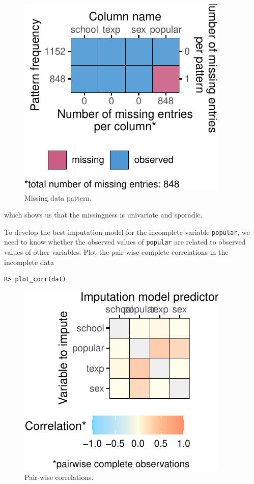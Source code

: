 \documentclass[
  article]{jss}
\begin{document}
\begin{figure}[h]

{\centering \includegraphics{manuscript_files/figure-pdf/fig-pattern-1.pdf}

}

\caption{\label{fig-pattern}Missing data pattern.}

\end{figure}

which shows us that the missingness is univariate and sporadic.

To develop the best imputation model for the incomplete variable
\texttt{popular}, we need to know whether the observed values of
\texttt{popular} are related to observed values of other variables. Plot
the pair-wise complete correlations in the incomplete data

\begin{verbatim}
R> plot_corr(dat)
\end{verbatim}

\begin{figure}[h]

{\centering \includegraphics{manuscript_files/figure-pdf/unnamed-chunk-9-1.pdf}

}

\caption{Pair-wise correlations.}

\end{figure}
\end{document}
